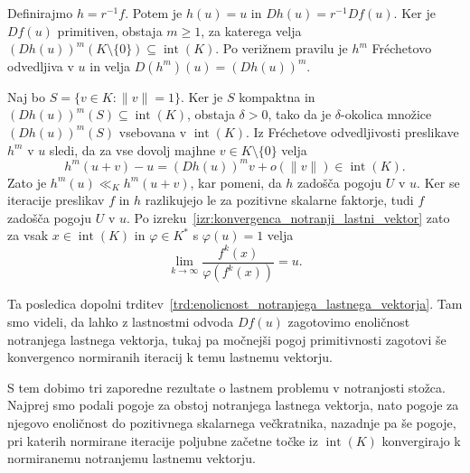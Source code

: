 \documentclass[mat2, tisk]{fmfdelo}
\begin{document}
\begin{dokaz}
  Definirajmo $h=r^{-1}f$. Potem je $h(u)=u$ in
  $Dh(u)=r^{-1}Df(u)$. Ker je $Df(u)$ primitiven,
  obstaja $m\geq1$, za katerega velja
  $(Dh(u))^m(K\setminus\{0\})\subseteq\operatorname{int}(K)$.
  Po verižnem pravilu je $h^m$ Fréchetovo odvedljiva
  v $u$ in velja $D(h^m)(u)=(Dh(u))^m$.

  Naj bo $S=\{v\in K:\|v\|=1\}$. Ker je $S$ kompaktna
  in $(Dh(u))^m(S)\subseteq\operatorname{int}(K)$,
  obstaja $\delta>0$, tako da je $\delta$-okolica množice
  $(Dh(u))^m(S)$ vsebovana v $\operatorname{int}(K)$.
  Iz Fréchetove odvedljivosti preslikave $h^m$ v $u$
  sledi, da za vse dovolj majhne
  $v\in K\setminus\{0\}$ velja
  \[
  h^m(u+v)-u=(Dh(u))^m v+o(\|v\|)
  \in\operatorname{int}(K).
  \]
  Zato je $h^m(u)\ll_Kh^m(u+v)$, kar pomeni, da
  $h$ zadošča pogoju $U$ v $u$. Ker se iteracije
  preslikav $f$ in $h$ razlikujejo le za pozitivne
  skalarne faktorje, tudi $f$ zadošča pogoju $U$ v $u$.
  Po izreku~\ref{izr:konvergenca_notranji_lastni_vektor}
  zato za vsak $x\in\operatorname{int}(K)$ in
  $\varphi\in K^*$ s $\varphi(u)=1$ velja
  \[
  \lim_{k\to\infty}\frac{f^k(x)}{\varphi(f^k(x))}=u.
  \]
\end{dokaz}


Ta posledica dopolni
trditev~\ref{trd:enolicnost_notranjega_lastnega_vektorja}. Tam smo
videli, da lahko z lastnostmi odvoda $Df(u)$ zagotovimo enoličnost
notranjega lastnega vektorja, tukaj pa močnejši pogoj primitivnosti
zagotovi še konvergenco normiranih iteracij k temu lastnemu
vektorju.

S tem dobimo tri zaporedne rezultate o lastnem problemu v
notranjosti stožca. Najprej smo podali pogoje za obstoj notranjega
lastnega vektorja, nato pogoje za njegovo enoličnost do pozitivnega
skalarnega večkratnika, nazadnje pa še pogoje, pri katerih normirane
iteracije poljubne začetne točke iz $\operatorname{int}(K)$
konvergirajo k normiranemu notranjemu lastnemu vektorju.
\end{document}
